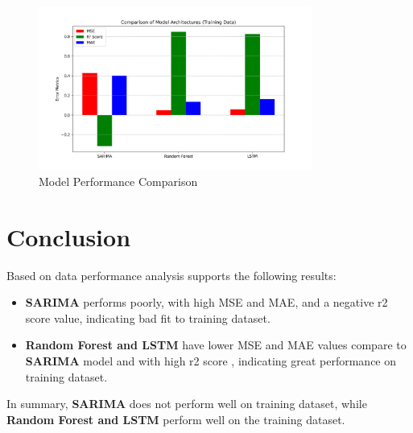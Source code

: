 \begin{figure}[h]
    \centering
    \includegraphics[width=0.8\textwidth]{./figures_amit/model_comparison_train.png}
    \caption{Model Performance Comparison}
    \label{fig:comparison}
\end{figure}

\section{Conclusion}
Based on  data performance analysis supports the following results:\begin{itemize}
    \item \textbf{SARIMA} performs poorly, with high MSE and MAE, and a negative r2 score value, indicating bad fit to training dataset.
    \item \textbf{Random Forest and LSTM} have lower MSE and MAE values compare to \textbf{SARIMA} model and with high r2 score , indicating great performance on training dataset.
\end{itemize}

In summary, \textbf{SARIMA} does not perform well on  training dataset, while \textbf{ Random Forest and LSTM} perform well on the training dataset.
